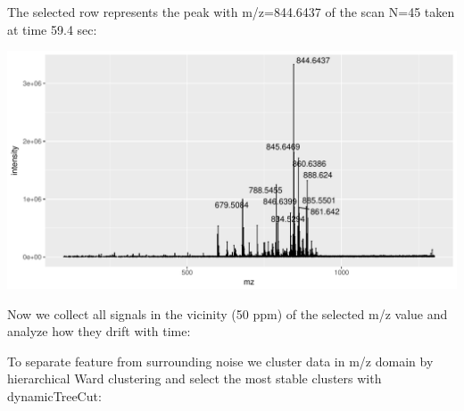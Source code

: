\documentclass[]{article}
\newenvironment{Shaded}{\begin{snugshade}}{\end{snugshade}}
\newcommand{\KeywordTok}[1]{\textcolor[rgb]{0.13,0.29,0.53}{\textbf{#1}}}
\newcommand{\FloatTok}[1]{\textcolor[rgb]{0.00,0.00,0.81}{#1}}
\newcommand{\StringTok}[1]{\textcolor[rgb]{0.31,0.60,0.02}{#1}}
\newcommand{\OperatorTok}[1]{\textcolor[rgb]{0.81,0.36,0.00}{\textbf{#1}}}
\newcommand{\NormalTok}[1]{#1}
\begin{document}
The selected row represents the peak with m/z=844.6437 of the scan N=45
taken at time 59.4 sec:

\begin{Shaded}
\end{Shaded}

\includegraphics{Supplementary_document_files/figure-latex/ion.plots-1.pdf}

Now we collect all signals in the vicinity (50 ppm) of the selected m/z
value and analyze how they drift with time:

\begin{Shaded}
\end{Shaded}

To separate feature from surrounding noise we cluster data in m/z domain
by hierarchical Ward clustering and select the most stable clusters with
dynamicTreeCut:
\end{document}
